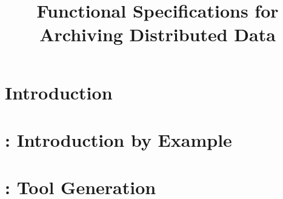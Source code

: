 \documentclass[nocopyrightspace]{sigplanconf}
\begin{document}
\title{Functional Specifications for Archiving Distributed Data}





\maketitle{}

%

\section {Introduction}
\label{sec:intro}


%

\section{\padsd{}: Introduction by Example}
\label{sec:informal}


\section{\padsd{}:  Tool Generation}
\label{sec:programming}

%

%
\end{document}
